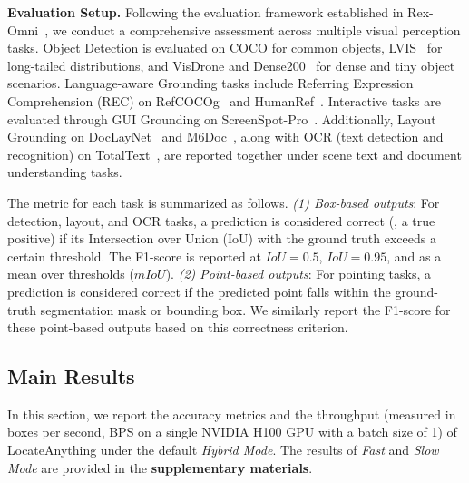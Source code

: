 \vspace{+1mm}
\noindent\textbf{Evaluation Setup.} Following the evaluation framework established in Rex-Omni~\citep{jiang2025rexomni}, we conduct a comprehensive assessment across multiple visual perception tasks.
Object Detection is evaluated on COCO for common objects, LVIS~\citep{gupta2019lvis} for long-tailed distributions, and VisDrone \citep{du2019visdrone} and Dense200~\citep{jiang2025rexomni} for dense and tiny object scenarios. Language-aware Grounding tasks include Referring Expression Comprehension (REC) on RefCOCOg~\citep{kazemzadeh-etal-2014-referitgame} and HumanRef~\citep{jiang2025referring}. Interactive tasks are evaluated through GUI Grounding on ScreenSpot-Pro~\citep{li2025screenspot}. Additionally, Layout Grounding on DocLayNet~\citep{pfitzmann2022doclaynet} and M6Doc~\citep{cheng2023m6doc}, along with OCR (text detection and recognition) on TotalText~\citep{ch2017total}, are reported together under scene text and document understanding tasks. 

The metric for each task is summarized as follows. \textit{(1) Box-based outputs}: For detection, layout, and OCR tasks, a prediction is considered correct (\ie, a true positive) if its Intersection over Union (IoU) with the ground truth exceeds a certain threshold. The F1-score is reported at $IoU = 0.5$, $IoU = 0.95$, and as a mean over thresholds ($mIoU$). \textit{(2) Point-based outputs}: For pointing tasks, a prediction is considered correct if the predicted point falls within the ground-truth segmentation mask or bounding box. We similarly report the F1-score for these point-based outputs based on this correctness criterion.



\vspace{-2mm}
\subsection{Main Results}
In this section, we report the accuracy metrics and the throughput (measured in boxes per second, BPS on a single NVIDIA H100 GPU with a batch size of 1) of LocateAnything under the default \textit{Hybrid Mode}. The results of \textit{Fast} and \textit{Slow Mode} are provided in the \textbf{supplementary materials}.



